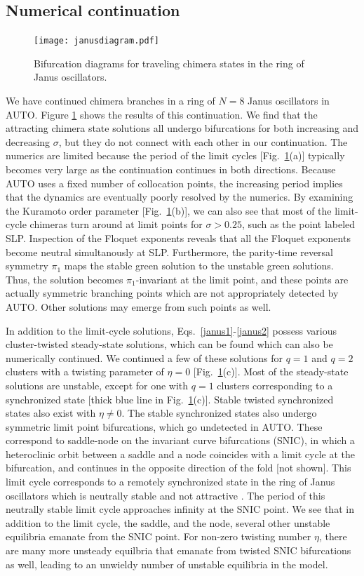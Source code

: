 \documentclass[aps,pre,amsmath,amssymb,floatfix,onecolumn,notitlepage,10pt]{revtex4-1}
\begin{document}
\subsection{Numerical continuation}
\begin{figure}[htb]
\texttt{[image: janusdiagram.pdf]}
\caption{Bifurcation diagrams for traveling chimera states in the ring of Janus oscillators. \label{fig4}}
\end{figure}
We have continued chimera branches in a ring of $N=8$ Janus oscillators in AUTO. Figure \ref{fig4} shows the results of this continuation.  We find that the attracting chimera state solutions all undergo bifurcations for both increasing and decreasing $\sigma$, but they do not connect with each other in our continuation. The numerics are limited because the period of the limit cycles [Fig.~\ref{fig4}(a)] typically becomes very large as the continuation continues in both directions. Because AUTO uses a fixed number of collocation points, the increasing period implies that the dynamics are eventually poorly resolved by the numerics. By examining the  Kuramoto order parameter [Fig.~\ref{fig4}(b)], we can also see that most of the limit-cycle chimeras turn around at limit points for $\sigma>0.25$, such as the point labeled SLP. Inspection of the Floquet exponents reveals that all the Floquet exponents become neutral simultanously at SLP. Furthermore, the parity-time reversal symmetry $\pi_1$ maps the stable green solution to the unstable green solutions. Thus, the solution becomes $\pi_1$-invariant at the limit point, and these points are actually symmetric branching points which are not appropriately detected by AUTO. Other solutions may emerge from such points as well.

In addition to the limit-cycle solutions, Eqs.~\eqref{janus1}-\eqref{janus2} possess various cluster-twisted steady-state solutions, which can be found which can also be numerically continued. We continued a few of these solutions for $q=1$ and $q=2$ clusters with a twisting parameter of $\eta=0$ [Fig.~\ref{fig4}(c)].  Most of the steady-state solutions are unstable, except for one with $q=1$ clusters corresponding to a synchronized state [thick blue line in Fig.~\ref{fig4}(c)]. Stable twisted synchronized states also exist with $\eta \neq 0$. The stable synchronized states also undergo symmetric limit point bifurcations, which go undetected in AUTO. These correspond to saddle-node on the invariant curve bifurcations (SNIC), in which a heteroclinic orbit between a saddle and a node coincides with a limit cycle at the bifurcation, and continues in the opposite direction of the fold [not shown]. This limit cycle corresponds to a remotely synchronized state in the ring of Janus oscillators which is neutrally stable and not attractive \cite{2019_Nicolaou}. The period of this neutrally stable limit cycle approaches infinity at the SNIC point. We see that in addition to the limit cycle, the saddle, and the node, several other unstable equilibria emanate from the SNIC point. For non-zero twisting number $\eta$, there are many more unsteady equilbria that emanate from twisted SNIC bifurcations as well, leading to an unwieldy number of unstable equilibria in the model.
\end{document}
